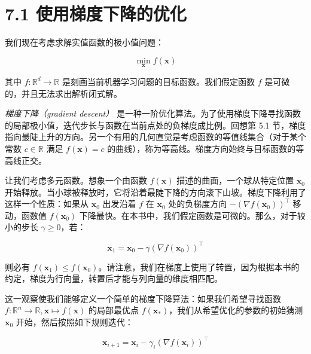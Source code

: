 \section*{7.1 使用梯度下降的优化}
\label{sec:7.1}

我们现在考虑求解实值函数的极小值问题：

\begin{equation}
\min_{\boldsymbol{x}} f(\boldsymbol{x})
\tag{7.4}\label{eq:7-4}
\end{equation}

其中 $ f : \mathbb{R}^d \to \mathbb{R} $ 是刻画当前机器学习问题的目标函数。我们假定函数 $ f $ 是可微的，并且无法求出解析闭式解。

\emph{梯度下降（gradient descent）} 是一种一阶优化算法。为了使用梯度下降寻找函数的局部极小值，迭代步长与函数在当前点处的负梯度成比例。回想第 5.1 节，梯度指向最陡上升的方向。另一个有用的几何直觉是考虑函数的等值线集合（对于某个常数 $ c \in \mathbb{R} $ 满足 $ f(\boldsymbol{x}) = c $ 的曲线），称为等高线。梯度方向始终与目标函数的等高线正交。

让我们考虑多元函数。想象一个由函数 $ f(\boldsymbol{x}) $ 描述的曲面，一个球从特定位置 $ \boldsymbol{x}_0 $ 开始释放。当小球被释放时，它将沿着最陡下降的方向滚下山坡。梯度下降利用了这样一个性质：如果从 $ \boldsymbol{x}_0 $ 出发沿着 $ f $ 在 $ \boldsymbol{x}_0 $ 处的负梯度方向 $ -(\nabla f(\boldsymbol{x}_0))^\top $ 移动，函数值 $ f(\boldsymbol{x}_0) $ 下降最快。在本书中，我们假定函数是可微的。那么，对于较小的步长 $ \gamma \geqslant 0 $，若：

\begin{equation}
\boldsymbol{x}_1 = \boldsymbol{x}_0 - \gamma (\nabla f(\boldsymbol{x}_0))^\top
\tag{7.5}\label{eq:7-5}
\end{equation}

则必有 $ f(\boldsymbol{x}_1) \leqslant f(\boldsymbol{x}_0) $。请注意，我们在梯度上使用了转置，因为根据本书的约定，梯度为行向量，转置后才能与列向量的维度相匹配。

这一观察使我们能够定义一个简单的梯度下降算法：如果我们希望寻找函数 $ f : \mathbb{R}^n \to \mathbb{R}, \boldsymbol{x} \mapsto f(\boldsymbol{x}) $ 的局部最优点 $ f(\boldsymbol{x}_*) $，我们从希望优化的参数的初始猜测 $ \boldsymbol{x}_0 $ 开始，然后按照如下规则迭代：

\begin{equation}
\boldsymbol{x}_{i+1} = \boldsymbol{x}_i - \gamma_i (\nabla f(\boldsymbol{x}_i))^\top
\tag{7.6}\label{eq:7-6}
\end{equation}

